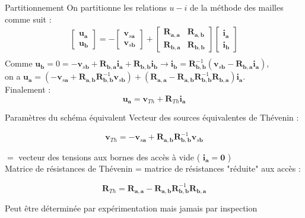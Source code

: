 \begin{frame}{Partitionnement}
On partitionne les relations $u-i$ de la méthode des mailles comme suit :
$$
\begin{gathered}
{\left[\begin{array}{c}
\mathbf{u}_{\mathbf{a}} \\
\mathbf{u}_{\mathbf{b}}
\end{array}\right]=-\left[\begin{array}{c}
\mathbf{v}_{s \mathbf{a}} \\
\mathbf{v}_{s \mathbf{b}}
\end{array}\right]+\left[\begin{array}{ll}
\mathbf{R}_{\mathbf{a}, \mathbf{a}} & \mathbf{R}_{\mathbf{a}, \mathbf{b}} \\
\mathbf{R}_{\mathbf{b}, \mathbf{a}} & \mathbf{R}_{\mathbf{b}, \mathbf{b}}
\end{array}\right]\left[\begin{array}{c}
\mathbf{i}_{\mathbf{a}} \\
\mathbf{i}_{\mathbf{b}}
\end{array}\right]} \\
\end{gathered}
$$
Comme $\mathbf{u}_{\mathbf{b}}=0=-\mathbf{v}_{s \mathbf{b}}+\mathbf{R}_{\mathbf{b}, \mathbf{a}} \mathbf{i}_{\mathbf{a}}+\mathbf{R}_{\mathbf{b}, \mathbf{b}} \mathbf{i}_{\mathbf{b}} \rightarrow \mathbf{i}_{\mathbf{b}}=\mathbf{R}_{\mathbf{b}, \mathbf{b}}^{-1}\left(\mathbf{v}_{s \mathbf{b}}-\mathbf{R}_{\mathbf{b}, \mathbf{a}} \mathbf{i}_{\mathbf{a}}\right)$, \\
on a $\mathbf{u}_{\mathbf{a}}=\left(-\mathbf{v}_{s \mathbf{a}}+\mathbf{R}_{\mathbf{a}, \mathbf{b}} \mathbf{R}_{\mathbf{b}, \mathbf{b}}^{-1} \mathbf{v}_{s \mathbf{b}}\right)+\left(\mathbf{R}_{\mathbf{a}, \mathbf{a}}-\mathbf{R}_{\mathbf{a}, \mathbf{b}} \mathbf{R}_{\mathbf{b}, \mathbf{b}}^{-1} \mathbf{R}_{\mathbf{b}, \mathbf{a}}\right) \mathbf{i}_{\mathbf{a}}$. \\
Finalement :
$$
\mathbf{u}_{\mathbf{a}}=\mathbf{v}_{T h}+\mathbf{R}_{T h} \mathbf{i}_{\mathbf{a}}
$$

\end{frame}

\begin{frame}{Paramètres du schéma équivalent}
Vecteur des sources équivalentes de Thévenin :

$$
\mathbf{v}_{T h}=-\mathbf{v}_{s \mathbf{a}}+\mathbf{R}_{\mathbf{a}, \mathbf{b}} \mathbf{R}_{\mathbf{b}, \mathbf{b}}^{-1} \mathbf{v}_{s \mathbf{b}}
$$

$=$ vecteur des tensions aux bornes des accès à vide ( $\mathbf{i}_{\mathbf{a}}=\mathbf{0}$ )\\
Matrice de résistances de Thévenin = matrice de résistances "réduite" aux accès :

$$
\mathbf{R}_{T h}=\mathbf{R}_{\mathbf{a}, \mathbf{a}}-\mathbf{R}_{\mathbf{a}, \mathbf{b}} \mathbf{R}_{\mathbf{b}, \mathbf{b}}^{-1} \mathbf{R}_{\mathbf{b}, \mathbf{a}}
$$

Peut être déterminée par expérimentation mais jamais par inspection

\end{frame}